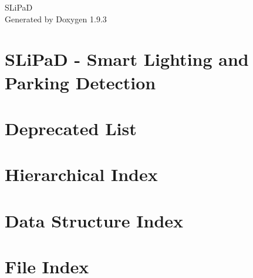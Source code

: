 \documentclass[twoside]{book}
\newcommand{\+}{\discretionary{\mbox{\scriptsize$\hookleftarrow$}}{}{}}
\newcommand{\clearemptydoublepage}{%
    \newpage{\pagestyle{empty}\cleardoublepage}%
  }
\begin{document}
  \raggedbottom
    \hypersetup{pageanchor=false,
                bookmarksnumbered=true,
                pdfencoding=unicode
               }
  \begin{titlepage}
  \vspace*{7cm}
  \begin{center}%
  {\Large SLi\+PaD}\\
  \vspace*{1cm}
  {\large Generated by Doxygen 1.9.3}\\
  \end{center}
  \end{titlepage}
  \clearemptydoublepage
  \tableofcontents
  \clearemptydoublepage
  \hypersetup{pageanchor=true}
\chapter{SLi\+PaD -\/ Smart Lighting and Parking Detection}
\label{md__r_e_a_d_m_e}

\chapter{Deprecated List}
\label{deprecated}

\chapter{Hierarchical Index}

\chapter{Data Structure Index}

\chapter{File Index}

\end{document}
